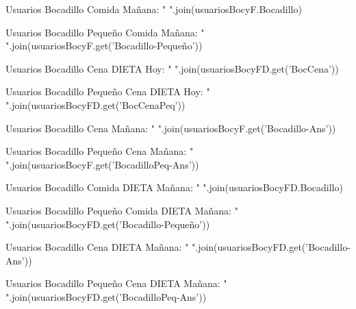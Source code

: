 \documentclass[12pt]{report}
\begin{document}
\vspace{0.2cm}
{%
Usuarios Bocadillo Comida Mañana: {{ " ".join(usuariosBocyF.Bocadillo) }} \\
{%
{%
Usuarios Bocadillo Pequeño Comida Mañana: {{ " ".join(usuariosBocyF.get('Bocadillo-Pequeño')) }} \\
{%
{%
Usuarios Bocadillo Cena DIETA Hoy: {{ " ".join(usuariosBocyFD.get('BocCena')) }} \\
{%
{%
Usuarios Bocadillo Pequeño Cena DIETA Hoy: {{ " ".join(usuariosBocyFD.get('BocCenaPeq')) }} \\
{%
{%
Usuarios Bocadillo Cena Mañana: {{ " ".join(usuariosBocyF.get('Bocadillo-Ans')) }} \\
{%
{%
Usuarios Bocadillo Pequeño Cena Mañana: {{ " ".join(usuariosBocyF.get('BocadilloPeq-Ans')) }} \\
{%
{%
Usuarios Bocadillo Comida DIETA Mañana: {{ " ".join(usuariosBocyFD.Bocadillo) }} \\
{%
{%
Usuarios Bocadillo Pequeño Comida DIETA Mañana: {{ " ".join(usuariosBocyFD.get('Bocadillo-Pequeño')) }} \\
{%
{%
Usuarios Bocadillo Cena DIETA Mañana: {{ " ".join(usuariosBocyFD.get('Bocadillo-Ans')) }} \\
{%
{%
Usuarios Bocadillo Pequeño Cena DIETA Mañana: {{ " ".join(usuariosBocyFD.get('BocadilloPeq-Ans')) }} \\
{%

}}}}}}}}}}}}}}}}}}}}
\end{document}

